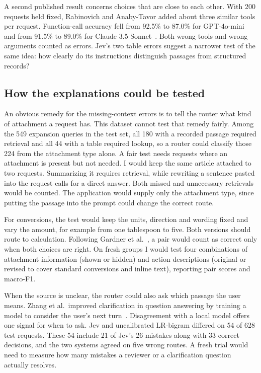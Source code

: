 \documentclass[conference]{IEEEtran}
\begin{document}
A second published result concerns choices that are close to each other. With 200 requests held fixed, Rabinovich and Anaby-Tavor added about three similar tools per request. Function-call accuracy fell from 92.5\% to 87.0\% for GPT-4o-mini and from 91.5\% to 89.0\% for Claude 3.5 Sonnet~\cite{tool-choices}. Both wrong tools and wrong arguments counted as errors. Jev's two table errors suggest a narrower test of the same idea: how clearly do its instructions distinguish passages from structured records?

\subsection{How the explanations could be tested}
An obvious remedy for the missing-context errors is to tell the router what kind of attachment a request has. This dataset cannot test that remedy fairly. Among the 549 expansion queries in the test set, all 180 with a recorded passage required retrieval and all 44 with a table required lookup, so a router could classify those 224 from the attachment type alone. A fair test needs requests where an attachment is present but not needed. I would keep the same article attached to two requests. Summarizing it requires retrieval, while rewriting a sentence pasted into the request calls for a direct answer. Both missed and unnecessary retrievals would be counted. The application would supply only the attachment type, since putting the passage into the prompt could change the correct route.

For conversions, the test would keep the units, direction and wording fixed and vary the amount, for example from one tablespoon to five. Both versions should route to calculation. Following Gardner et al.~\cite{contrast-sets}, a pair would count as correct only when both choices are right. On fresh groups I would test four combinations of attachment information (shown or hidden) and action descriptions (original or revised to cover standard conversions and inline text), reporting pair scores and macro-F1.

When the source is unclear, the router could also ask which passage the user means. Zhang et al.\ improved clarification in question answering by training a model to consider the user's next turn~\cite{clarification}. Disagreement with a local model offers one signal for when to ask. Jev and uncalibrated LR-bigram differed on 54 of 628 test requests. These 54 include 21 of Jev's 26 mistakes along with 33 correct decisions, and the two systems agreed on five wrong routes. A fresh trial would need to measure how many mistakes a reviewer or a clarification question actually resolves.
\end{document}
